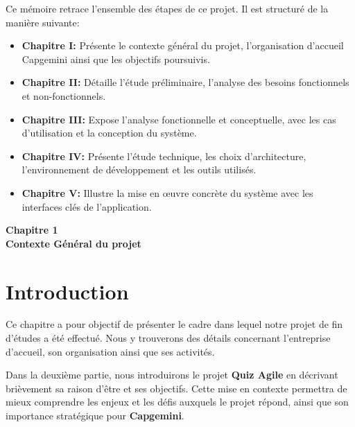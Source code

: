 \documentclass[12pt,a4paper]{report}
\begin{document}
\medskip
\noindent
Ce mémoire retrace l'ensemble des étapes de ce projet. Il est structuré de la manière suivante:
\begin{itemize}
    \item \textbf{Chapitre I:} Présente le contexte général du projet, l'organisation d'accueil Capgemini ainsi que les objectifs poursuivis.
    \item \textbf{Chapitre II:} Détaille l'étude préliminaire, l'analyse des besoins fonctionnels et non-fonctionnels.
    \item \textbf{Chapitre III:} Expose l'analyse fonctionnelle et conceptuelle, avec les cas d'utilisation et la conception du système.
    \item \textbf{Chapitre IV:} Présente l'étude technique, les choix d'architecture, l'environnement de développement et les outils utilisés.
    \item \textbf{Chapitre V:} Illustre la mise en œuvre concrète du système avec les interfaces clés de l'application.
\end{itemize}

\cleardoublepage
\thispagestyle{empty}
\begin{center}
    \vspace*{4cm}
    {\Huge \textbf{Chapitre 1}}\\[1.5cm]
    {\LARGE \textbf{Contexte Général du projet}}
\end{center}
\cleardoublepage

\setcounter{section}{0}

\section{Introduction}

Ce chapitre a pour objectif de présenter le cadre dans lequel notre
projet de fin d'études a été effectué. Nous y trouverons
des détails concernant l'entreprise
d'accueil, son organisation ainsi que ses activités.

Dans la deuxième partie, nous introduirons le projet \textbf{Quiz Agile}
en décrivant brièvement sa raison d'être et ses
objectifs. Cette mise en contexte permettra de mieux comprendre les
enjeux et les défis auxquels le projet répond, ainsi que son importance
stratégique pour \textbf{Capgemini}.
\end{document}
